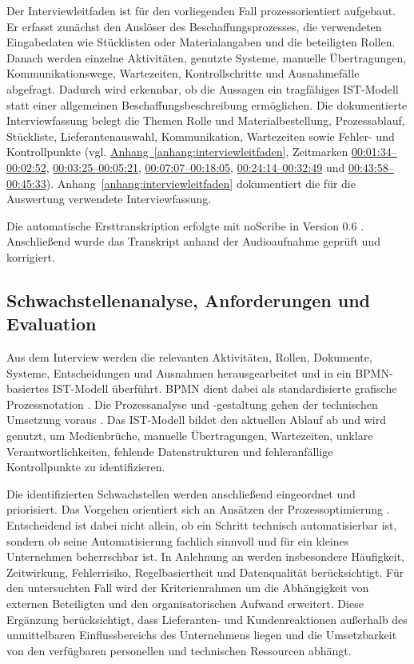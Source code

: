\documentclass[a4paper,12pt]{article}
\begin{document}
Der Interviewleitfaden ist für den vorliegenden Fall prozessorientiert aufgebaut. Er erfasst zunächst den Auslöser des Beschaffungsprozesses, die verwendeten Eingabedaten wie Stücklisten oder Materialangaben und die beteiligten Rollen. Danach werden einzelne Aktivitäten, genutzte Systeme, manuelle Übertragungen, Kommunikationswege, Wartezeiten, Kontrollschritte und Ausnahmefälle abgefragt. Dadurch wird erkennbar, ob die Aussagen ein tragfähiges IST-Modell statt einer allgemeinen Beschaffungsbeschreibung ermöglichen. Die dokumentierte Interviewfassung belegt die Themen Rolle und Materialbestellung, Prozessablauf, Stückliste, Lieferantenauswahl, Kommunikation, Wartezeiten sowie Fehler- und Kontrollpunkte (vgl. \hyperref[anhang:interviewleitfaden]{Anhang~\ref*{anhang:interviewleitfaden}}, Zeitmarken \hyperlink{itv:rolle-materialbestellung}{00:01:34--00:02:52}, \hyperlink{itv:prozess-stueckliste}{00:03:25--00:05:21}, \hyperlink{itv:lieferanten-angebote}{00:07:07--00:18:05}, \hyperlink{itv:kommunikation-fehler}{00:24:14--00:32:49} und \hyperlink{itv:kontrolle-freigabe}{00:43:58--00:45:33}). Anhang~\ref{anhang:interviewleitfaden} dokumentiert die für die Auswertung verwendete Interviewfassung.

Die automatische Ersttranskription erfolgte mit noScribe in Version 0.6 \parencite{droege_noscribe_2026}. Anschließend wurde das Transkript anhand der Audioaufnahme geprüft und korrigiert.

\subsection{Schwachstellenanalyse, Anforderungen und Evaluation}
\label{sec:evaluationslogik}
Aus dem Interview werden die relevanten Aktivitäten, Rollen, Dokumente, Systeme, Entscheidungen und Ausnahmen herausgearbeitet und in ein BPMN-basiertes IST-Modell überführt. BPMN dient dabei als standardisierte grafische Prozessnotation \parencite{object_management_group_bpmn_2014}. Die Prozessanalyse und -gestaltung gehen der technischen Umsetzung voraus \parencite{moreira_methodology_2025}. Das IST-Modell bildet den aktuellen Ablauf ab und wird genutzt, um Medienbrüche, manuelle Übertragungen, Wartezeiten, unklare Verantwortlichkeiten, fehlende Datenstrukturen und fehleranfällige Kontrollpunkte zu identifizieren.

Die identifizierten Schwachstellen werden anschließend eingeordnet und priorisiert. Das Vorgehen orientiert sich an Ansätzen der Prozessoptimierung \parencite{kompetenzzentrum_augsburg_prozessoptimierung_2020}. Entscheidend ist dabei nicht allein, ob ein Schritt technisch automatisierbar ist, sondern ob seine Automatisierung fachlich sinnvoll und für ein kleines Unternehmen beherrschbar ist. In Anlehnung an \textcite{wellmann_framework_2020} werden insbesondere Häufigkeit, Zeitwirkung, Fehlerrisiko, Regelbasiertheit und Datenqualität berücksichtigt. Für den untersuchten Fall wird der Kriterienrahmen um die Abhängigkeit von externen Beteiligten und den organisatorischen Aufwand erweitert. Diese Ergänzung berücksichtigt, dass Lieferanten- und Kundenreaktionen außerhalb des unmittelbaren Einflussbereichs des Unternehmens liegen und die Umsetzbarkeit von den verfügbaren personellen und technischen Ressourcen abhängt.
\end{document}
